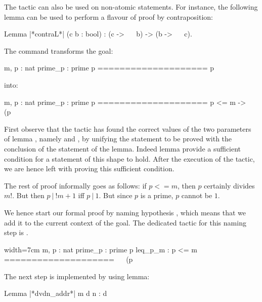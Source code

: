 The  tactic can also be used on non-atomic statements. For
instance, the following lemma can be used to perform a flavour of
proof by contraposition:

\begin{coq}{}{}
Lemma |*contraL*| (c b : bool) : (c -> ~~ b) -> (b -> ~~ c).
\end{coq}

The command  transforms the goal:

\begin{coq}{}{}
m, p : nat
prime_p : prime p
====================
p %
\end{coq}

into:

\begin{coqout}{}{}
m, p : nat
prime_p : prime p
====================
 p <= m -> ~~ (p %
\end{coqout}

First observe that the  tactic has found the correct values
of the two parameters  of lemma , namely
 and , by unifying the statement to be
proved with the conclusion  of the statement of the lemma.
Indeed lemma  provide a sufficient condition for a
statement of this shape to hold. After the execution of the tactic, we
are hence left with proving this sufficient condition.

The rest of proof informally goes as follows: if $p <= m$, then $p$
certainly divides $m!$. But then $p\ |\ !m + 1$ iff $p\ |\ 1$. But
since $p$ is a prime, $p$ cannot be $1$.

We hence start our formal proof by naming hypothesis , which
means that we add it to the current context of the goal. The dedicated
tactic for this naming step is .

\begin{coq}{}{{width=2cm}
move=> leq_p_m.
\end{coq}
\begin{coqout}{}{width=7cm}
m, p : nat
prime_p : prime p
leq_p_m :  p <= m
====================
 ~~ (p %
\end{coqout}

The next step is implemented by using lemma:

\begin{coq}{}{}
Lemma |*dvdn_addr*| m d n : d %
\end{coq}

